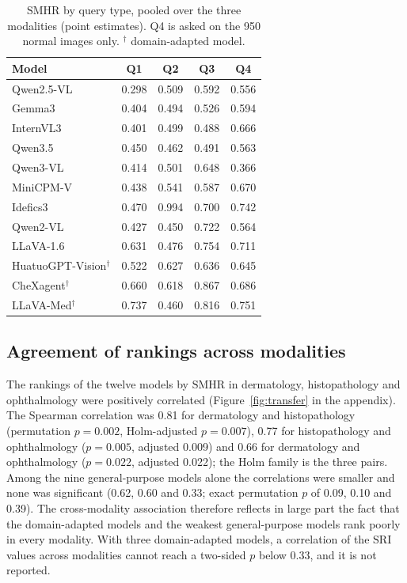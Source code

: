 \documentclass[11pt,a4paper]{article}
\newcommand{\SMHR}{\ensuremath{\mathrm{SMHR}}}
\newcommand{\SRI}{\ensuremath{\mathrm{SRI}}}
\begin{document}
\begin{table}[tbp]
\centering
\small
\caption{\SMHR{} by query type, pooled over the three modalities (point estimates). Q4 is asked on the 950 normal images only. $^{\dagger}$ domain-adapted model.}
\label{tab:perquery}
\begin{tabular}{@{}lcccc@{}}
\toprule
Model & Q1 & Q2 & Q3 & Q4 \\
\midrule
Qwen2.5-VL & 0.298 & 0.509 & 0.592 & 0.556 \\
Gemma3 & 0.404 & 0.494 & 0.526 & 0.594 \\
InternVL3 & 0.401 & 0.499 & 0.488 & 0.666 \\
Qwen3.5 & 0.450 & 0.462 & 0.491 & 0.563 \\
Qwen3-VL & 0.414 & 0.501 & 0.648 & 0.366 \\
MiniCPM-V & 0.438 & 0.541 & 0.587 & 0.670 \\
Idefics3 & 0.470 & 0.994 & 0.700 & 0.742 \\
Qwen2-VL & 0.427 & 0.450 & 0.722 & 0.564 \\
LLaVA-1.6 & 0.631 & 0.476 & 0.754 & 0.711 \\
\midrule
HuatuoGPT-Vision$^{\dagger}$ & 0.522 & 0.627 & 0.636 & 0.645 \\
CheXagent$^{\dagger}$ & 0.660 & 0.618 & 0.867 & 0.686 \\
LLaVA-Med$^{\dagger}$ & 0.737 & 0.460 & 0.816 & 0.751 \\
\bottomrule
\end{tabular}
\end{table}

\subsection{Agreement of rankings across modalities}
\label{subsec:res_transfer}

The rankings of the twelve models by \SMHR{} in dermatology, histopathology and ophthalmology were positively correlated (Figure~\ref{fig:transfer} in the appendix). The Spearman correlation was 0.81 for dermatology and histopathology (permutation $p = 0.002$, Holm-adjusted $p = 0.007$), 0.77 for histopathology and ophthalmology ($p = 0.005$, adjusted 0.009) and 0.66 for dermatology and ophthalmology ($p = 0.022$, adjusted 0.022); the Holm family is the three pairs. Among the nine general-purpose models alone the correlations were smaller and none was significant (0.62, 0.60 and 0.33; exact permutation $p$ of 0.09, 0.10 and 0.39). The cross-modality association therefore reflects in large part the fact that the domain-adapted models and the weakest general-purpose models rank poorly in every modality. With three domain-adapted models, a correlation of the \SRI{} values across modalities cannot reach a two-sided $p$ below 0.33, and it is not reported.
\end{document}
